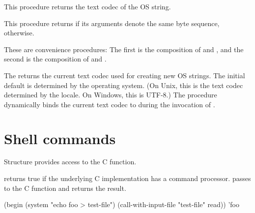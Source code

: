 \begin{protos}
\end{protos}
%
This procedure returns the text codec of the OS string.

\begin{protos}
\end{protos}
%
This procedure returns  if its arguments denote the same
byte sequence,  otherwise.

\begin{protos}
\end{protos}
%
These are convenience procedures: The first is the composition of
 and , and the second
is the composition of  and
.

\begin{protos}
\end{protos}
\noindent
The  returns the current text codec
used for creating new OS strings.  The initial default is determined
by the operating system.  (On Unix, this is the text codec determined
by the locale.  On Windows, this is UTF-8.)  The
 procedure dynamically binds the
current text codec to  during the invocation of
.

\section{Shell commands}

Structure  provides access to the C 
 function.

\begin{protos}
\end{protos}
\noindent
{} returns true if the underlying C implementation
 has a command processor.
 passes  to the C
  function and returns the result.

\begin{example}
(begin
  (system "echo foo > test-file")
  (call-with-input-file "test-file" read))
\evalsto 'foo
\end{example}

